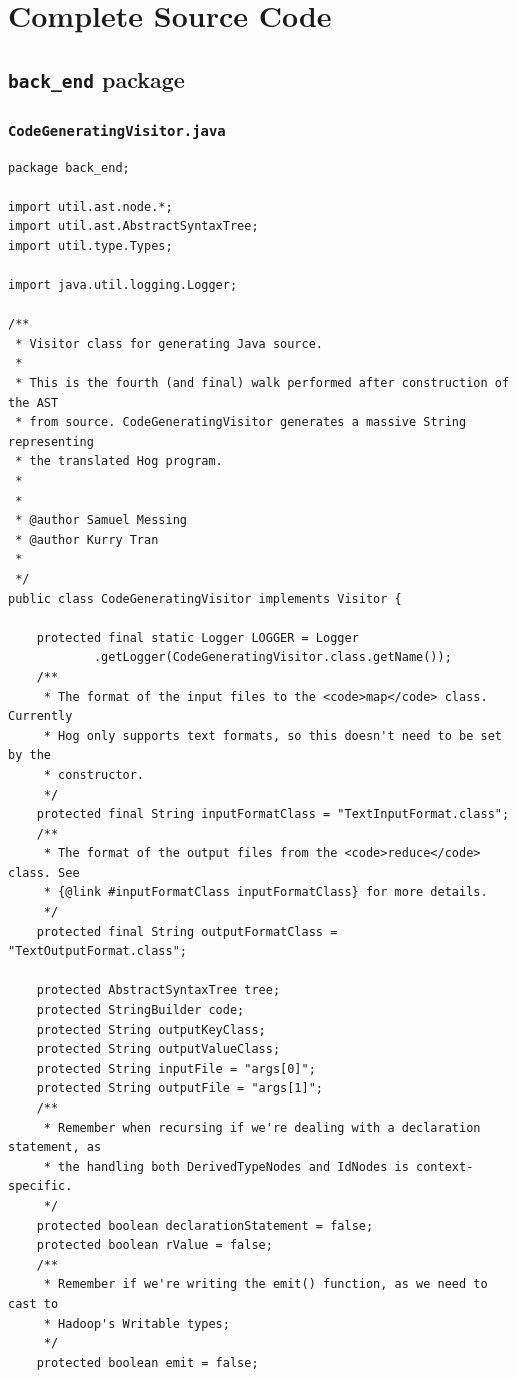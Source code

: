 \documentclass{book}
\begin{document}
\chapter{Complete Source Code}

\section{\texttt{back\_end} package}

\subsection{\texttt{CodeGeneratingVisitor.java}}

\begin{verbatim}
package back_end;

import util.ast.node.*;
import util.ast.AbstractSyntaxTree;
import util.type.Types;

import java.util.logging.Logger;

/**
 * Visitor class for generating Java source.
 * 
 * This is the fourth (and final) walk performed after construction of the AST
 * from source. CodeGeneratingVisitor generates a massive String representing
 * the translated Hog program.
 * 
 * 
 * @author Samuel Messing
 * @author Kurry Tran
 * 
 */
public class CodeGeneratingVisitor implements Visitor {

	protected final static Logger LOGGER = Logger
			.getLogger(CodeGeneratingVisitor.class.getName());
	/**
	 * The format of the input files to the <code>map</code> class. Currently
	 * Hog only supports text formats, so this doesn't need to be set by the
	 * constructor.
	 */
	protected final String inputFormatClass = "TextInputFormat.class";
	/**
	 * The format of the output files from the <code>reduce</code> class. See
	 * {@link #inputFormatClass inputFormatClass} for more details.
	 */
	protected final String outputFormatClass = "TextOutputFormat.class";

	protected AbstractSyntaxTree tree;
	protected StringBuilder code;
	protected String outputKeyClass;
	protected String outputValueClass;
	protected String inputFile = "args[0]";
	protected String outputFile = "args[1]";
	/**
	 * Remember when recursing if we're dealing with a declaration statement, as
	 * the handling both DerivedTypeNodes and IdNodes is context-specific.
	 */
	protected boolean declarationStatement = false;
	protected boolean rValue = false;
	/**
	 * Remember if we're writing the emit() function, as we need to cast to
	 * Hadoop's Writable types;
	 */
	protected boolean emit = false;


\end{verbatim}
\end{document}
